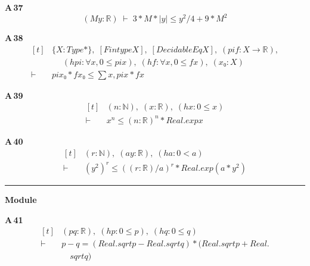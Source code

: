 \noindent\textbf{A\,37}\quad{}
{\footnotesize\[ (\mathit{M} \mathit{y} : \mathbb{R} ) \;\vdash\; 3 * \mathit{M} * |\mathit{y}| \leq \mathit{y} ^{2} / 4 + 9 * \mathit{M} ^{2} \]}

\noindent\textbf{A\,38}\quad{}
{\footnotesize\[ \begin{aligned}[t]
&\{ \mathit{X} : \mathit{Type}*\},\; [\mathit{Fintype} \mathit{X}],\; [\mathit{DecidableEq} \mathit{X}],\; (\mathit{pi} \mathit{f} : \mathit{X} \to \mathbb{R} ),\\
&\quad \; (\mathit{hpi} : \forall \mathit{x}, 0 \leq \mathit{pi} \mathit{x}),\; (\mathit{hf} : \forall \mathit{x}, 0 \leq \mathit{f} \mathit{x}),\; (\mathit{x₀} : \mathit{X})\\
\vdash\;&\mathit{pi} \mathit{x₀} * \mathit{f} \mathit{x₀} \leq \textstyle\sum \mathit{x}, \mathit{pi} \mathit{x} * \mathit{f} \mathit{x}
\end{aligned} \]}

\noindent\textbf{A\,39}\quad{}
{\footnotesize\[ \begin{aligned}[t]
&(\mathit{n} : \mathbb{N} ),\; (\mathit{x} : \mathbb{R} ),\; (\mathit{hx} : 0 \leq \mathit{x})\\
\vdash\;&\mathit{x} ^{\mathit{n}} \leq (\mathit{n} : \mathbb{R} ) ^{\mathit{n}} * \mathit{Real}.\mathit{exp} \mathit{x}
\end{aligned} \]}

\noindent\textbf{A\,40}\quad{}
{\footnotesize\[ \begin{aligned}[t]
&(\mathit{r} : \mathbb{N} ),\; (\mathit{a} \mathit{y} : \mathbb{R} ),\; (\mathit{ha} : 0 < \mathit{a})\\
\vdash\;&(\mathit{y} ^{2}) ^{\mathit{r}} \leq ((\mathit{r} : \mathbb{R} ) / \mathit{a}) ^{\mathit{r}} * \mathit{Real}.\mathit{exp} (\mathit{a} * \mathit{y} ^{2})
\end{aligned} \]}

\vspace{4pt}\noindent\rule{\columnwidth}{0.4pt}\par\vspace{2pt}
\noindent\textbf{Module }\par\vspace{3pt}

\noindent\textbf{A\,41}\quad{}
{\footnotesize\[ \begin{aligned}[t]
&(\mathit{p} \mathit{q} : \mathbb{R} ),\; (\mathit{hp} : 0 \leq \mathit{p}),\; (\mathit{hq} : 0 \leq \mathit{q})\\
\vdash\;&\mathit{p} - \mathit{q} = (\mathit{Real}.\mathit{sqrt} \mathit{p} - \mathit{Real}.\mathit{sqrt} \mathit{q}) * (\mathit{Real}.\mathit{sqrt} \mathit{p} + \mathit{Real}.\\
&\quad \mathit{sqrt} \mathit{q})
\end{aligned} \]}

